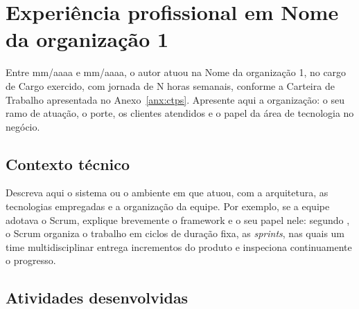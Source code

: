 \documentclass[memorial,capa]{texifsap}
\begin{document}
\chapter{Experiência profissional em Nome da organização 1}
\label{cap:experiencia1}


Entre mm/aaaa e mm/aaaa, o autor atuou na Nome da organização 1, no
cargo de Cargo exercido, com jornada de N horas semanais, conforme a
Carteira de Trabalho apresentada no Anexo~\ref{anx:ctps}. Apresente aqui
a organização: o seu ramo de atuação, o porte, os clientes atendidos e o
papel da área de tecnologia no negócio.

\section{Contexto técnico}
\label{sec:contexto1}


Descreva aqui o sistema ou o ambiente em que atuou, com a arquitetura,
as tecnologias empregadas e a organização da equipe. Por exemplo, se a
equipe adotava o Scrum, explique brevemente o framework e o seu papel
nele: segundo \citet{Schwaber:2020}, o Scrum organiza o trabalho em
ciclos de duração fixa, as \textit{sprints}, nas quais um time
multidisciplinar entrega incrementos do produto e inspeciona
continuamente o progresso.

\section{Atividades desenvolvidas}
\label{sec:atividades1}
\end{document}
